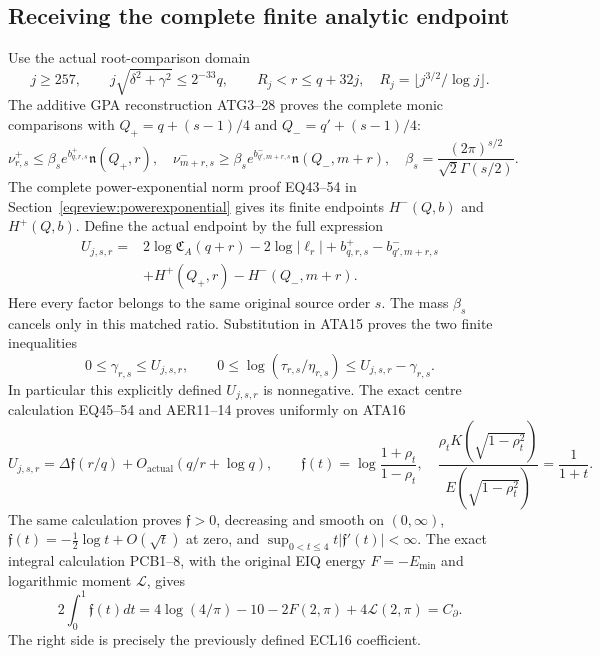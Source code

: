 \documentclass[11pt,a4paper]{article}
\begin{document}
\subsection{Receiving the complete finite analytic endpoint}
Use the actual root-comparison domain
\[
 j\ge257,\qquad j\sqrt{\delta^2+\gamma^2}\le2^{-33}q,
 \qquad R_j<r\le q+32j,
 \quad R_j=\lfloor j^{3/2}/\log j\rfloor.                \tag{ATA16}
\]
The additive GPA reconstruction ATG3--28 proves the complete monic comparisons
with $Q_+=q+(s-1)/4$ and $Q_-=q'+(s-1)/4$:
\[
 \nu^+_{r,s}\le\beta_se^{b^+_{q,r,s}}\mathfrak n(Q_+,r),
 \quad
 \nu^-_{m+r,s}\ge\beta_se^{b^-_{q',m+r,s}}\mathfrak n(Q_-,m+r),
 \quad\beta_s=\frac{(2\pi)^{s/2}}{\sqrt2\Gamma(s/2)}.
\]
The complete power-exponential norm proof EQ43--54 in
Section~\ref{eqreview:powerexponential} gives its finite endpoints
$H^-(Q,b)$ and $H^+(Q,b)$.
Define the actual endpoint by the full expression
\[
\begin{split}
 U_{j,s,r}={}&2\log\mathfrak C_A(q+r)-2\log|\ell_r|
 +b^+_{q,r,s}-b^-_{q',m+r,s}\\
 &+H^+(Q_+,r)-H^-(Q_-,m+r).
\end{split}\tag{ATA17}
\]
Here every factor belongs to the same original source order $s$.
The mass $\beta_s$ cancels only in this matched ratio.  Substitution
in ATA15 proves the two finite inequalities
\[
 0\le\gamma_{r,s}\le U_{j,s,r},\qquad
 0\le\log(\tau_{r,s}/\eta_{r,s})\le U_{j,s,r}-\gamma_{r,s}.
                                                               \tag{ATA18}
\]
In particular this explicitly defined $U_{j,s,r}$ is nonnegative.
The exact centre calculation EQ45--54 and AER11--14 proves uniformly on ATA16
\[
 U_{j,s,r}=\Delta\mathfrak f(r/q)
                  +O_{\mathrm{actual}}(q/r+\log q),
 \qquad
 \mathfrak f(t)=\log\frac{1+\rho_t}{1-\rho_t},\quad
 \frac{\rho_tK(\sqrt{1-\rho_t^2})}
      {E(\sqrt{1-\rho_t^2})}=\frac1{1+t}.               \tag{ATA19}
\]
The same calculation proves $\mathfrak f>0$, decreasing and smooth
on $(0,\infty)$, $\mathfrak f(t)=-\tfrac12\log t+O(\sqrt t)$
at zero, and $\sup_{0<t\le4}t|\mathfrak f'(t)|<\infty$.
The exact integral calculation PCB1--8, with the original EIQ energy
$F=-E_{\min}$ and logarithmic moment $\mathcal L$, gives
\[
 2\int_0^1\mathfrak f(t)dt
 =4\log(4/\pi)-10-2F(2,\pi)+4\mathcal L(2,\pi)
 =C_\partial.                                        \tag{ATA20}
\]
The right side is precisely the previously defined ECL16 coefficient.
\end{document}
